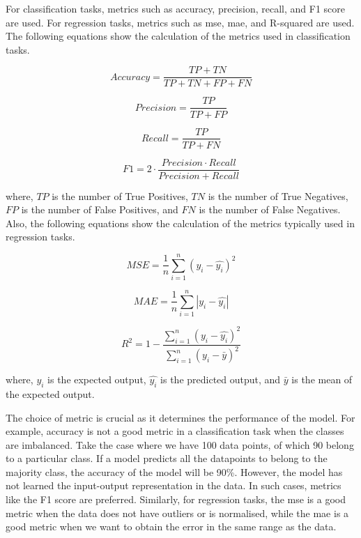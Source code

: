 For classification tasks, metrics such as accuracy, precision, recall, and F1 score are used. For regression tasks, metrics such as \gls{mse}, \gls{mae}, and R-squared are used. The following equations show the calculation of the metrics used in classification tasks.

\begin{equation}
 \label{eq:accuracy}
 Accuracy = \frac{TP + TN}{TP + TN + FP + FN}
\end{equation}

\begin{equation}
 \label{eq:precision}
 Precision = \frac{TP}{TP + FP}  
\end{equation}

\begin{equation}
 \label{eq:recall}
 Recall = \frac{TP}{TP + FN}
\end{equation}

\begin{equation}
 \label{eq:F1}
 F1 = 2 \cdot \frac{Precision\cdot Recall}{Precision + Recall}
\end{equation}

where, $TP$ is the number of True Positives, $TN$ is the number of True Negatives, $FP$ is the number of False Positives, and $FN$ is the number of False Negatives. Also, the following equations show the calculation of the metrics typically used in regression tasks.

\begin{equation}
 \label{eq:MSE_metric}
 MSE = \frac{1}{n} \sum_{i=1}^{n}{(y_i - \hat{y_i})^2}
\end{equation}

\begin{equation}
 \label{eq:MAE}
 MAE = \frac{1}{n} \sum_{i=1}^{n}{|y_i - \hat{y_i}|}
\end{equation}

\begin{equation}
 \label{eq:R2}
 R^2 = 1 - \frac{\sum_{i=1}^{n}{(y_i - \hat{y_i})^2}}{\sum_{i=1}^{n}{(y_i - \bar{y})^2}}
\end{equation}

where, $y_i$ is the expected output, $\hat{y_i}$ is the predicted output, and $\bar{y}$ is the mean of the expected output.


The choice of metric is crucial as it determines the performance of the model. For example, accuracy is not a good metric in a classification task when the classes are imbalanced. Take the case where we have 100 data points, of which 90 belong to a particular class. If a model predicts all the datapoints to belong to the majority class, the accuracy of the model will be 90\%. However, the model has not learned the input-output representation in the data. In such cases, metrics like the F1 score are preferred. Similarly, for regression tasks, the \gls{mse} is a good metric when the data does not have outliers or is normalised, while the \gls{mae} is a good metric when we want to obtain the error in the same range as the data.

